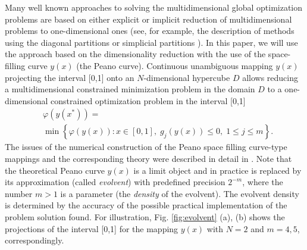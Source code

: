 \documentclass[twocolumn]{svjour3}          %
\begin{document}
	Many well known approaches to solving the multidimensional global optimization problems are based on either explicit or implicit reduction of multidimensional problems to one-dimensional ones (see, for example, the description of methods using the diagonal partitions \cite{Sergeyev2006} or simplicial partitions \cite{Zilinskas2008}). In this paper, we will use the approach based on the dimensionality reduction with the use of the space-filling curve $y(x)$ (the Peano curve). Continuous unambiguous mapping $y(x)$ projecting the interval [0,1] onto an $N$-dimensional hypercube $D$ allows reducing a multidimensional constrained minimization problem in the domain $D$ to a one-dimensional constrained optimization problem in the interval [0,1]
\small
\begin{align}\label{one_dimensional_problem}
	& \varphi(y(x^\ast)) =  \nonumber \\
	& \min \left\{\varphi(y(x)): x \in [0,1], \; g_j(y(x))\leq 0, \; 1 \leq j \leq m\right\}.
\end{align}
\normalsize
The issues of the numerical construction of the Peano space filling curve-type mappings and the corresponding theory were described in detail in \cite{Strongin2000,Sergeyev2013}. Note that the theoretical Peano curve $y(x)$ is a limit object and in practice is replaced by its approximation (called \textit{evolvent}) with predefined precision $2^{-m}$, where the number $m>1$ is a parameter (the \textit{density} of the evolvent). The evolvent density is determined by the accuracy of the possible practical implementation of the problem solution found. For  illustration, Fig. \ref{fig:evolvent} (a), (b) shows the projections of the interval [0,1] for the mapping $y(x)$ with $N=2$ and $m=4,5$, correspondingly.
\end{document}
